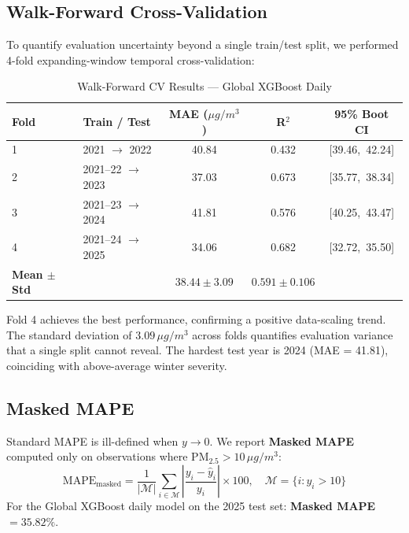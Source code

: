 \documentclass[11pt,a4paper]{article}
\begin{document}
\subsection{Walk-Forward Cross-Validation}
To quantify evaluation uncertainty beyond a single train/test split, we performed 4-fold expanding-window temporal cross-validation:

\begin{table}[H]
    \centering
    \caption{Walk-Forward CV Results --- Global XGBoost Daily}
    \label{tab:cv}
    \begin{tabular}{llccc}
        \toprule
        \textbf{Fold} & \textbf{Train / Test} & \textbf{MAE ($\mu g/m^3$)} & \textbf{R$^2$} & \textbf{95\% Boot CI} \\
        \midrule
        1 & 2021 $\to$ 2022  & 40.84 & 0.432 & [39.46,\ 42.24] \\
        2 & 2021--22 $\to$ 2023 & 37.03 & 0.673 & [35.77,\ 38.34] \\
        3 & 2021--23 $\to$ 2024 & 41.81 & 0.576 & [40.25,\ 43.47] \\
        4 & 2021--24 $\to$ 2025 & 34.06 & 0.682 & [32.72,\ 35.50] \\
        \midrule
        \textbf{Mean $\pm$ Std} & & $\mathbf{38.44 \pm 3.09}$ & $0.591 \pm 0.106$ & \\
        \bottomrule
    \end{tabular}
\end{table}

Fold 4 achieves the best performance, confirming a positive data-scaling trend. The standard deviation of $3.09\,\mu g/m^3$ across folds quantifies evaluation variance that a single split cannot reveal. The hardest test year is 2024 (MAE = 41.81), coinciding with above-average winter severity.

\subsection{Masked MAPE}
Standard MAPE is ill-defined when $y \to 0$. We report \textbf{Masked MAPE} computed only on observations where PM$_{2.5} > 10\,\mu g/m^3$:
\begin{equation}
    \text{MAPE}_{\text{masked}} = \frac{1}{|\mathcal{M}|} \sum_{i \in \mathcal{M}} \left|\frac{y_i - \hat{y}_i}{y_i}\right| \times 100, \quad \mathcal{M} = \{i : y_i > 10\}
\end{equation}
For the Global XGBoost daily model on the 2025 test set: \textbf{Masked MAPE $= 35.82\%$}.
\end{document}

